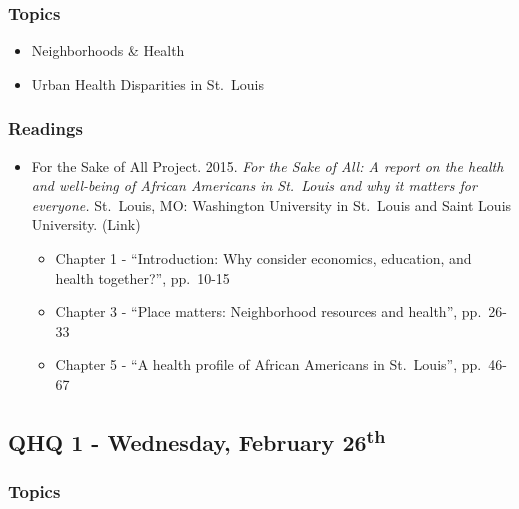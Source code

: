 \documentclass[]{book}
\providecommand{\tightlist}{%
  \setlength{\itemsep}{0pt}\setlength{\parskip}{0pt}}
\begin{document}
\hypertarget{topics-12}{%
\subsubsection*{Topics}\label{topics-12}}

\begin{itemize}
\tightlist
\item
  Neighborhoods \& Health
\item
  Urban Health Disparities in St.~Louis
\end{itemize}

\hypertarget{readings-11}{%
\subsubsection*{Readings}\label{readings-11}}

\begin{itemize}
\tightlist
\item
  For the Sake of All Project. 2015. \emph{For the Sake of All: A report on the health and well-being of African Americans in St.~Louis and why it matters for everyone.} St.~Louis, MO: Washington University in St.~Louis and Saint Louis University. (Link)

  \begin{itemize}
  \tightlist
  \item
    Chapter 1 - ``Introduction: Why consider economics, education, and health together?'', pp.~10-15
  \item
    Chapter 3 - ``Place matters: Neighborhood resources and health'', pp.~26-33
  \item
    Chapter 5 - ``A health profile of African Americans in St.~Louis'', pp.~46-67
  \end{itemize}
\end{itemize}

\hypertarget{qhq-1---wednesday-february-26th}{%
\subsection*{\texorpdfstring{QHQ 1 - Wednesday, February 26\textsuperscript{th}}{QHQ 1 - Wednesday, February 26th}}\label{qhq-1---wednesday-february-26th}}

\hypertarget{topics-13}{%
\subsubsection*{Topics}\label{topics-13}}
\end{document}
